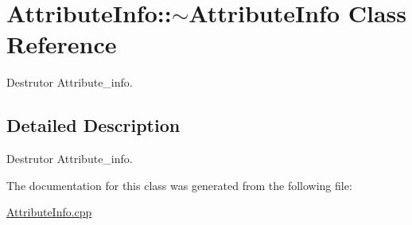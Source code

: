 \hypertarget{class_attribute_info_1_1~_attribute_info}{}\section{Attribute\+Info\+:\+:$\sim$\+Attribute\+Info Class Reference}
\label{class_attribute_info_1_1~_attribute_info}


Destrutor Attribute\+\_\+info.  




\subsection{Detailed Description}
Destrutor Attribute\+\_\+info. 

The documentation for this class was generated from the following file\+:\begin{DoxyCompactItemize}
\item 
\hyperlink{_attribute_info_8cpp}{Attribute\+Info.\+cpp}\end{DoxyCompactItemize}
